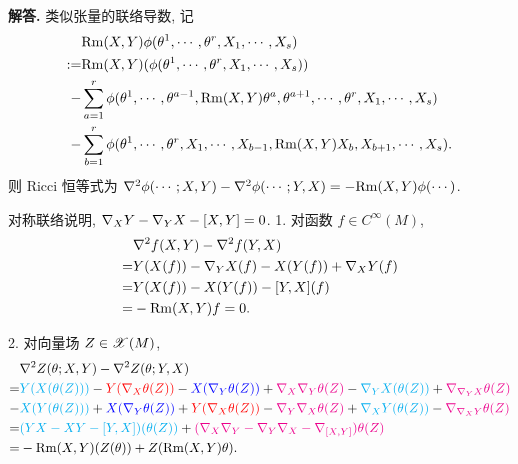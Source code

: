 \documentclass{ctexart}
\newenvironment{solution}{\par\noindent\textbf{解答. }}{\par}
\begin{document}
\begin{solution}
    类似张量的联络导数, 记
    \[
        \begin{aligned}
         & \mathrm{Rm}(X, Y)\phi(\theta^1, \cdots, \theta^r, X_1, \cdots, X_s) \\
        :=& \mathrm{Rm}(X, Y)(\phi(\theta^1, \cdots, \theta^r, X_1, \cdots, X_s)) \\
        -& \sum_{a = 1}^{r}\phi(\theta^1, \cdots, \theta^{a - 1}, \mathrm{Rm}(X, Y)\theta^a, \theta^{a + 1}, \cdots, \theta^r, X_1, \cdots, X_s) \\
        -& \sum_{b = 1}^{r}\phi(\theta^1, \cdots, \theta^r, X_1, \cdots, X_{b - 1}, \mathrm{Rm}(X, Y)X_{b}, X_{b + 1}, \cdots, X_s).
        \end{aligned}
    \]
    则 Ricci 恒等式为 $\nabla^2\phi(\cdots; X, Y) - \nabla^2\phi(\cdots; Y, X) = -\mathrm{Rm}(X, Y)\phi(\cdots)$.

    对称联络说明, $\nabla_{X}{Y} - \nabla_{Y}{X} - [X, Y] = 0$.
    1. 对函数 $f \in C^{\infty}(M)$,
    \[
        \begin{aligned}
             & \nabla^2f(X, Y) - \nabla^2f(Y, X) \\
            =& Y(X(f)) - \nabla_{Y}{X}(f) - X(Y(f)) + \nabla_{X}{Y}(f) \\
            =& Y(X(f)) - X(Y(f)) - [Y, X](f) \\
            =& -\mathrm{Rm}(X, Y)f = 0.
        \end{aligned}
    \]

    2. 对向量场 $Z \in \mathscr{X}(M)$,
    \[
        \begin{aligned}
             & \nabla^2Z(\theta; X, Y) - \nabla^2Z(\theta; Y, X) \\
            =& \textcolor{cyan}{Y(X(\theta(Z)))} - \textcolor{red}{Y(\nabla_{X}\theta(Z))} - \textcolor{blue}{X(\nabla_{Y}\theta(Z))} + \textcolor{magenta}{\nabla_{X}\nabla_{Y}\theta(Z)} - \textcolor{cyan}{\nabla_{Y}X(\theta(Z))} + \textcolor{magenta}{\nabla_{\nabla_{Y}X}\theta(Z)} \\
            -& \textcolor{cyan}{X(Y(\theta(Z)))} + \textcolor{blue}{X(\nabla_{Y}\theta(Z))} + \textcolor{red}{Y(\nabla_{X}\theta(Z))} - \textcolor{magenta}{\nabla_{Y}\nabla_{X}\theta(Z)} + \textcolor{cyan}{\nabla_{X}Y(\theta(Z))} - \textcolor{magenta}{\nabla_{\nabla_{X}Y}\theta(Z)} \\
            =& \textcolor{cyan}{(YX - XY - [Y, X])(\theta(Z))} + \textcolor{magenta}{(\nabla_{X}\nabla_{Y} - \nabla_{Y}\nabla_{X} - \nabla_{[X, Y]})\theta(Z)} \\
            =& -\mathrm{Rm}(X, Y)(Z(\theta)) + Z(\mathrm{Rm}(X, Y)\theta).
        \end{aligned}
    \]


\end{solution}
\end{document}
